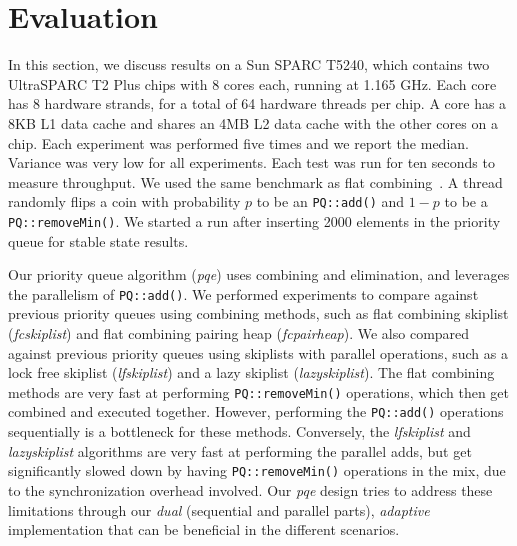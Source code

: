 \section{Evaluation}
\label{Sec-Evaluation}

In this section, we discuss results on a Sun SPARC T5240, which contains two UltraSPARC T2 Plus chips with 8 cores each, running at 1.165 GHz. Each core has 8 hardware strands, for a total of 64 hardware threads per chip. A core has a 8KB L1 data cache and shares an 4MB L2 data cache with the other cores on a chip. Each experiment was performed five times and we report the median. Variance was very low for all experiments. Each test was run for ten seconds to measure throughput. We used the same benchmark as flat combining~\cite{Hendler2010}. A thread randomly flips a coin with  probability $p$ to be an \texttt{PQ::add()} and $1-p$ to be a \texttt{PQ::removeMin()}. We started a run after inserting 2000 elements in the priority queue for stable state results. 

Our priority queue algorithm (\emph{pqe}) uses combining and elimination, and leverages the parallelism of \texttt{PQ::add()}. We performed experiments to compare against previous priority queues using combining methods, such as flat combining skiplist (\emph{fcskiplist}) and flat combining pairing heap (\emph{fcpairheap}). We also compared against previous priority queues using skiplists with parallel operations, such as a lock free skiplist (\emph{lfskiplist}) and a lazy skiplist (\emph{lazyskiplist}). The flat combining methods are very fast at performing \texttt{PQ::removeMin()} operations, which then get combined and executed together. However, performing the \texttt{PQ::add()} operations sequentially is a bottleneck for these methods. Conversely, the \emph{lfskiplist} and \emph{lazyskiplist} algorithms are very fast at performing the parallel adds, but get significantly slowed down by having \texttt{PQ::removeMin()} operations in the mix, due to the synchronization overhead involved. Our \emph{pqe} design tries to address these limitations through our \emph{dual} (sequential and parallel parts), \emph{adaptive} implementation that can be beneficial in the different scenarios. 

